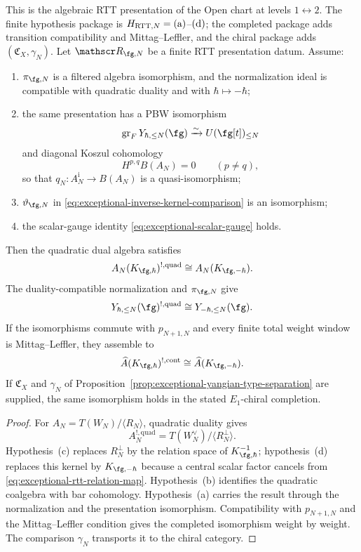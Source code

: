\begin{proposition}
\label{prop:exceptional-yangian-template}
This is the algebraic RTT presentation of the Open chart at levels
$1\leftrightarrow2$.  The finite hypothesis package is
$H_{\mathrm{RTT},N}=\textup{(a)}$--$\textup{(d)}$; the completed
package adds transition compatibility and Mittag--Leffler, and the
chiral package adds $(\mathfrak C_X,\gamma_N)$.
Let $\mathscr R_{\fg,N}$ be a finite RTT presentation datum.  Assume:
\begin{enumerate}[label=\textup{(\alph*)}]
\item $\pi_{\fg,N}$ is a filtered algebra isomorphism, and the
normalization ideal is compatible with quadratic duality and with
$\hbar\mapsto-\hbar$;
\item the same presentation has a PBW isomorphism
\[
\operatorname{gr}_F Y_{\hbar,\le N}(\fg)
\xrightarrow{\sim}U(\fg[t])_{\le N}
\]
and diagonal Koszul cohomology
\[
H^{p,q}B(A_N)=0\qquad(p\ne q),
\]
so that $q_N\colon A_N^{\mathrm i}\to B(A_N)$ is a quasi-isomorphism;
\item $\vartheta_{\fg,N}$ in
\eqref{eq:exceptional-inverse-kernel-comparison} is an isomorphism;
\item the scalar-gauge identity
\eqref{eq:exceptional-scalar-gauge} holds.
\end{enumerate}
Then the quadratic dual algebra satisfies
\begin{equation}\label{eq:exceptional-finite-quadratic-dual}
A_N(K_{\fg,\hbar})^{!,\mathrm{quad}}
\cong A_N(K_{\fg,-\hbar}).
\end{equation}
The duality-compatible normalization and $\pi_{\fg,N}$ give
\[
Y_{\hbar,\le N}(\fg)^{!,\mathrm{quad}}
\cong Y_{-\hbar,\le N}(\fg).
\]
If the isomorphisms commute with $p_{N+1,N}$ and every finite total
weight window is Mittag--Leffler, they assemble to
\begin{equation}\label{eq:exceptional-completed-quadratic-dual}
\widehat A(K_{\fg,\hbar})^{!,\mathrm{cont}}
\cong\widehat A(K_{\fg,-\hbar}).
\end{equation}
If $\mathfrak C_X$ and $\gamma_N$ of
Proposition~\ref{prop:exceptional-yangian-type-separation} are supplied,
the same isomorphism holds in the stated $E_1$-chiral completion.
\end{proposition}

\begin{proof}
For $A_N=T(W_N)/\langle R_N\rangle$, quadratic duality gives
\[
A_N^{!,\mathrm{quad}}
=T(W_N^\vee)/\langle R_N^\perp\rangle.
\]
Hypothesis~\textup{(c)} replaces $R_N^\perp$ by the relation space of
$K_{\fg,\hbar}^{-1}$; hypothesis~\textup{(d)} replaces this kernel by
$K_{\fg,-\hbar}$ because a central scalar factor cancels from
\eqref{eq:exceptional-rtt-relation-map}.  Hypothesis~\textup{(b)}
identifies the quadratic coalgebra with bar cohomology.
Hypothesis~\textup{(a)} carries the result through the normalization
and the presentation isomorphism.  Compatibility
with $p_{N+1,N}$ and the Mittag--Leffler condition gives the completed
isomorphism weight by weight.  The comparison $\gamma_N$ transports it
to the chiral category.
\end{proof}

